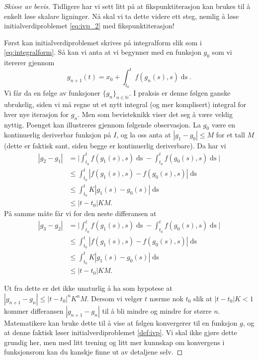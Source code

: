 \documentclass{article}
\theoremstyle{plain}
\theoremstyle{definition}
\theoremstyle{remark}
\newcommand{\diff}[1]{\mathop{d#1}}
\newcommand{\fcn}{x}
\newcommand{\abs}[1]{|#1|}
\newcommand{\biggabs}[1]{\bigg|#1\bigg|}
\begin{document}
\begin{proof}[Skisse av bevis]
    Tidligere har vi sett litt på at fikspunktiterasjon kan brukes til å enkelt løse skalare ligninger. Nå skal vi ta dette videre ett steg, nemlig å løse initialverdiproblemet \eqref{eq:ivp_2} med fikspunktiterasjon!

    Først kan initialverdiproblemet skrives på integralform slik som i \eqref{eq:integralform}. Så kan vi anta at vi begynner med en funksjon $g_0$ som vi itererer gjennom
    \begin{equation}
        g_{n+1}(t) = \fcn_0 + \int_{t_0}^{t} f(g_n(s), s) \diff{s}.
    \end{equation}
    Vi får da en følge av funksjoner $\{g_n\}_{n \in \mathbb{N}}$. I praksis er denne følgen ganske ubrukelig, siden vi må regne ut et nytt integral (og mer komplisert) integral for hver nye iterasjon for $g_n$. Men som bevisteknikk viser det seg å være veldig nyttig. Poenget kan illustreres gjennom følgende observasjon. La $g_0$ være en kontinuerlig deriverbar funksjon på $I$, og la oss anta at $|g_1 - g_0| \leq M$ for et tall $M$ (dette er faktisk sant, siden begge er kontinuerlig deriverbare). Da har vi
    \begin{equation*}
        \begin{aligned}
            \abs{g_{2} - g_1} & = \biggabs{\int_{t_0}^{t} f(g_1(s), s) \diff{s} - \int_{t_0}^{t} f(g_{0}(s), s) \diff{s}} \\
            & \leq \int_{t_0}^{t} \abs{f(g_1(s), s) - f(g_{0}(s), s)} \diff{s} \\
            & \leq \int_{t_0}^{t} K \abs{g_1(s) - g_{0}(s)} \diff{s} \\
            & \leq \abs{t - t_0} K M.
        \end{aligned}
    \end{equation*}
    På samme måte får vi for den neste differansen at
    \begin{equation*}
        \begin{aligned}
            \abs{g_{3} - g_2} & = \biggabs{\int_{t_0}^{t} f(g_1(s), s) \diff{s} - \int_{t_0}^{t} f(g_{0}(s), s) \diff{s}} \\
            & \leq \int_{t_0}^{t} \abs{f(g_1(s), s) - f(g_{0}(s), s)} \diff{s} \\
            & \leq \int_{t_0}^{t} K \abs{g_1(s) - g_{0}(s)} \diff{s} \\
            & \leq \abs{t - t_0} K M.
        \end{aligned}
    \end{equation*}

    Ut fra dette er det ikke unaturlig å ha som hypotese at $\abs{g_{n+1} - g_n} \leq \abs{t-t_0}^n K^n M$. Dersom vi velger $t$ nærme nok $t_0$ slik at $\abs{t-t_0} K < 1$ kommer differansen $\abs{g_{n+1} - g_n}$ til å bli mindre og mindre for større $n$. Matematikere kan bruke dette til å vise at følgen konvergerer til en funksjon $g$, og at denne faktisk løser initialverdiproblemet \eqref{def:ivp}. Vi skal ikke gjøre dette grundig her, men med litt trening og litt mer kunnskap om konvergens i funksjonsrom kan du kanskje finne ut av detaljene selv.
\end{proof}
\end{document}
